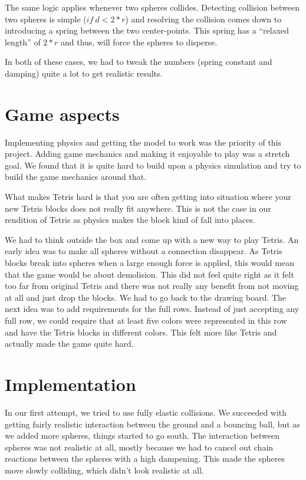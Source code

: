 \documentclass[11pt]{article} %
\begin{document}
The same logic applies whenever two spheres collides. Detecting collision between two spheres is simple ($if~d < 2 * r$) and resolving the collision comes down to introducing a spring between the two center-points. This spring has a ``relaxed length'' of $2 * r$ and thus, will force the spheres to disperse.

In both of these cases, we had to tweak the numbers (spring constant and damping) quite a lot to get realistic results.
\section{Game aspects}
Implementing physics and getting the model to work was the priority of this project. Adding game mechanics and making it enjoyable to play was a stretch goal. We found that it is quite hard to build upon a physics simulation and try to build the game mechanics around that.

What makes Tetris hard is that you are often getting into situation where your new Tetris blocks does not really fit anywhere. This is not the case in our rendition of Tetris as physics makes the block kind of fall into places.

We had to think outside the box and come up with a new way to play Tetris. An early idea was to make all spheres without a connection disappear. As Tetris blocks break into spheres when a large enough force is applied, this would mean that the game would be about demolision. This did not feel quite right as it felt too far from original Tetris and there was not really any benefit from not moving at all and just drop the blocks. We had to go back to the drawing board. The next idea was to add requirements for the full rows. Instead of just accepting any full row, we could require that at least five colors were represented in this row and have the Tetris blocks in different colors. This felt more like Tetris and actually made the game quite hard. 

\section{Implementation}
In our first attempt, we tried to use fully elastic collisions. We succeeded with getting fairly realistic interaction between the ground and a bouncing ball, but as we added more spheres, things started to go south. The interaction between spheres was not realistic at all, mostly because we had to cancel out chain reactions between the spheres with a high dampening. This made the spheres move slowly colliding, which didn't look realistic at all.
\end{document}
